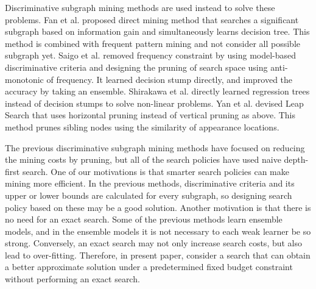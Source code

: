 Discriminative subgraph mining methods are used instead to solve these problems.
Fan et al. \cite{Fan:2008} proposed direct mining method 
that searches a significant subgraph based on information gain and simultaneously learns decision tree.
This method is combined with frequent pattern mining and not consider all possible subgraph yet.
Saigo et al. \cite{Saigo:2009} removed frequency constraint 
by using model-based discriminative criteria 
and designing the pruning of search space using anti-monotonic of frequency.
It learned decision stump directly,  
and improved the accuracy by taking an ensemble.
Shirakawa et al. \cite{Shirakawa:2018} directly learned regression trees instead of decision stumps
to solve non-linear problems.
Yan et al. devised Leap Search \cite{Yan:2008} that uses horizontal pruning 
instead of vertical pruning as above.
This method prunes sibling nodes using the similarity of appearance locations.

The previous discriminative subgraph mining methods have focused on reducing the mining costs by pruning, 
but all of the search policies have used naive depth-first search.
One of our motivations is that smarter search policies can make mining more efficient.
In the previous methods, 
discriminative criteria and its upper or lower bounds are calculated for every subgraph,
so designing search policy based on these may be a good solution.
Another motivation is that there is no need for an exact search.
Some of the previous methods learn ensemble models, 
and in the ensemble models it is not necessary to each weak learner be so strong.
Conversely, an exact search may not only increase search costs, but also lead to over-fitting.
Therefore, in present paper, 
consider a search that can obtain a better approximate solution 
under a predetermined fixed budget constraint without performing an exact search.
